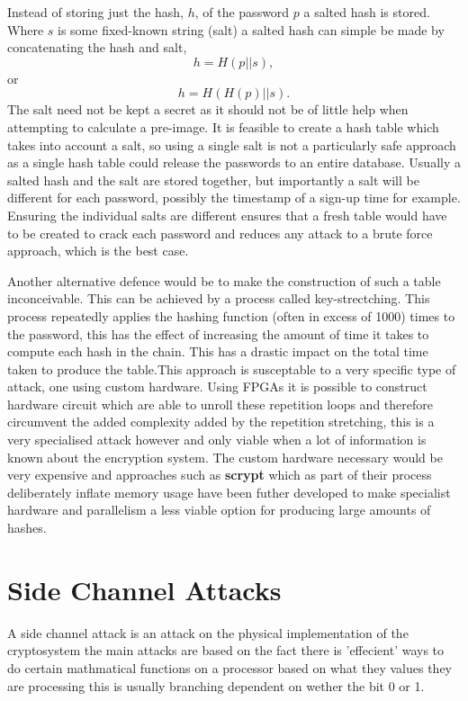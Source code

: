 \documentclass[a4paper,12pt]{article}
\begin{document}
Instead of storing just the hash, $h$, of the password $p$ a salted hash is stored. Where $s$ is some fixed-known string (salt) a salted hash can simple be made by concatenating the hash and salt, $$h = H(p||s),$$ or $$h = H(H(p) || s).$$
The salt need not be kept a secret as it should not be of little help when attempting to calculate a pre-image. It is feasible to create a hash table which takes into account a salt, so using a single salt is not a particularly safe approach as a single hash table could release the passwords to an entire database. Usually a salted hash and the salt are stored together, but importantly a salt will be different for each password, possibly the timestamp of a sign-up time for example. Ensuring the individual salts are different ensures that a fresh table would have to be created to crack each password and reduces any attack to a brute force approach, which is the best case.

Another alternative defence would be to make the construction of such a table inconceivable. This can be achieved by a process called key-strectching. This process repeatedly applies the hashing function (often in excess of 1000) times to the password, this has the effect of increasing the amount of time it takes to compute each hash in the chain. This has a drastic impact on the total time taken to produce the table.This approach is susceptable to a very specific type of attack, one using custom hardware. 
Using FPGAs it is possible to construct hardware circuit which are able to unroll these repetition loops and therefore circumvent the added complexity added by the repetition stretching, this is a very specialised attack however and only viable when a lot of information is known about the encryption system. The custom hardware necessary would be very expensive and approaches such as \textbf{scrypt}\cite{colin} which as part of their process deliberately inflate memory usage have been futher developed to make specialist hardware and parallelism a less viable option for producing large amounts of hashes.



\section{Side Channel Attacks}
A side channel attack is an attack on the physical implementation of the cryptosystem the main attacks are based on the fact there is 'effecient' ways to do certain mathmatical functions on a processor based on what they values they are processing this is usually branching dependent on wether the bit 0 or 1. 
\end{document}
